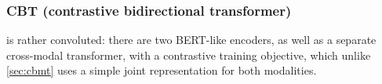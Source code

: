 \subsubsection{CBT (contrastive bidirectional transformer)}
\citet{sun2019learning} is rather convoluted: there are two BERT-like
encoders, as well as a separate cross-modal transformer, with a
contrastive training objective, which unlike \cref{sec:cbmt} uses a
simple joint representation for both modalities.


